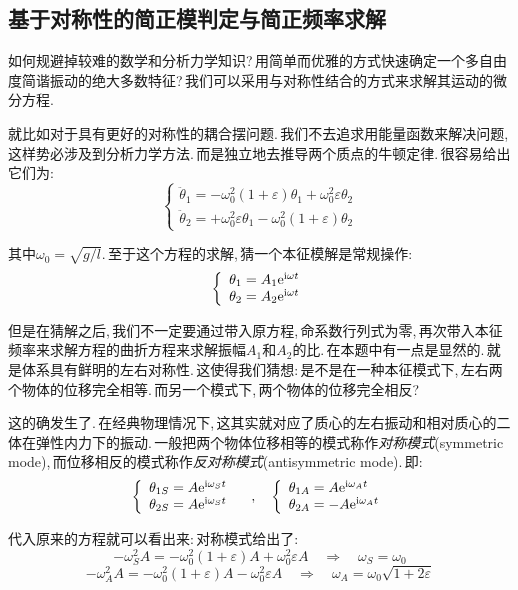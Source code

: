\subsection{基于对称性的简正模判定与简正频率求解}

如何规避掉较难的数学和分析力学知识?\,用简单而优雅的方式快速确定一个多自由度简谐振动的绝大多数特征?\,我们可以采用与对称性结合的方式来求解其运动的微分方程.

就比如对于具有更好的对称性的耦合摆问题.\,我们不去追求用能量函数来解决问题,\,这样势必涉及到分析力学方法.\,而是独立地去推导两个质点的牛顿定律.\,很容易给出它们为:
\[\left\{\begin{array}{l}\ddot{\theta}_1=-\omega_0^2(1+\varepsilon)\theta_1+\omega_0^2\varepsilon\theta_2 \\ \ddot{\theta}_2=+\omega_0^2\varepsilon\theta_1-\omega_0^2(1+\varepsilon)\theta_2\end{array}\right.\]

其中$\omega_0=\sqrt{g/l}$.\,至于这个方程的求解,\,猜一个本征模解是常规操作:
\[\left\{\begin{array}{l} \theta_1=A_1{\rm e}^{{\rm i}\omega t}\\\theta_2=A_2{\rm e}^{{\rm i}\omega t} \end{array}\right.\]

但是在猜解之后,\,我们不一定要通过带入原方程,\,命系数行列式为零,\,再次带入本征频率来求解方程的曲折方程来求解振幅$A_1$和$A_2$的比.\,在本题中有一点是显然的.\,就是体系具有鲜明的左右对称性.\,这使得我们猜想:\,是不是在一种本征模式下,\,左右两个物体的位移完全相等.\,而另一个模式下,\,两个物体的位移完全相反?

这的确发生了.\,在经典物理情况下,\,这其实就对应了质心的左右振动和相对质心的二体在弹性内力下的振动.\,一般把两个物体位移相等的模式称作\emph{对称模式}(symmetric mode),\,而位移相反的模式称作\emph{反对称模式}(antisymmetric mode).\,即:
\[\left\{\begin{array}{l} \theta_{1S}=A{\rm e}^{{\rm i}\omega_S t}\\\theta_{2S}=A{\rm e}^{{\rm i}\omega_S t} \end{array}\right.\quad ,\quad \left\{\begin{array}{l} \theta_{1A}=A{\rm e}^{{\rm i}\omega_A t}\\\theta_{2A}=-A{\rm e}^{{\rm i}\omega_A t} \end{array}\right.\]

代入原来的方程就可以看出来:\,对称模式给出了:
\[-\omega_S^2A=-\omega_0^2(1+\varepsilon)A+\omega_0^2\varepsilon A\quad \Rightarrow \quad \omega_S=\omega_0\]
\[-\omega_A^2A=-\omega_0^2(1+\varepsilon)A-\omega_0^2\varepsilon A\quad \Rightarrow \quad \omega_A=\omega_0\sqrt{1+2\varepsilon}\]

